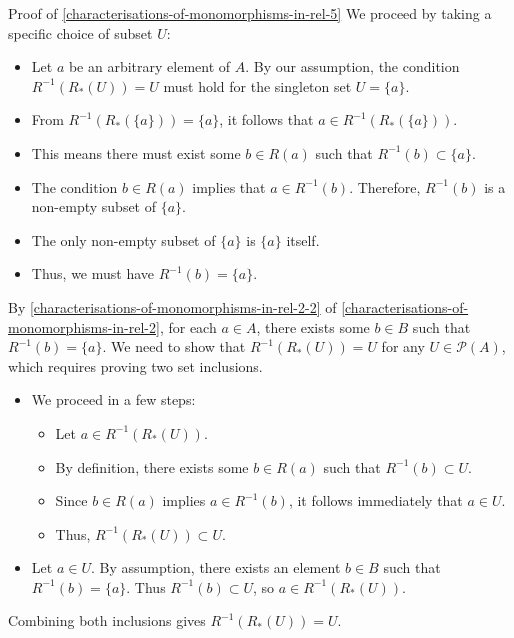 \begin{Proof}{Proof of \cref{characterisations-of-monomorphisms-in-rel-5}}
    We proceed by taking a specific choice of subset $U$:
    \begin{itemize}
        \item Let $a$ be an arbitrary element of $A$. By our assumption, the condition $R^{-1}(R_{*}(U))=U$ must hold for the singleton set $U=\{a\}$.
        \item From $R^{-1}(R_{*}(\{a\}))=\{a\}$, it follows that $a\in R^{-1}(R_{*}(\{a\}))$.
        \item This means there must exist some $b\in R(a)$ such that $R^{-1}(b)\subset\{a\}$.
        \item The condition $b\in R(a)$ implies that $a\in R^{-1}(b)$. Therefore, $R^{-1}(b)$ is a non-empty subset of $\{a\}$.
        \item The only non-empty subset of $\{a\}$ is $\{a\}$ itself.
        \item Thus, we must have $R^{-1}(b)=\{a\}$.
    \end{itemize}

    By \cref{characterisations-of-monomorphisms-in-rel-2-2} of \cref{characterisations-of-monomorphisms-in-rel-2}, for each $a\in A$, there exists some $b\in B$ such that $R^{-1}(b)=\{a\}$. We need to show that $R^{-1}(R_{*}(U))=U$ for any $U\in\mathcal{P}(A)$, which requires proving two set inclusions.
    \begin{itemize}
        \item{}We proceed in a few steps:
            \begin{itemize}
                \item Let $a\in R^{-1}(R_{*}(U))$.
                \item By definition, there exists some $b\in R(a)$ such that $R^{-1}(b)\subset U$.
                \item Since $b\in R(a)$ implies $a\in R^{-1}(b)$, it follows immediately that $a\in U$.
                \item Thus, $R^{-1}(R_{*}(U))\subset U$.
            \end{itemize}
        \item{}Let $a\in U$. By assumption, there exists an element $b\in B$ such that $R^{-1}(b)=\{a\}$. Thus $R^{-1}(b)\subset U$, so $a\in R^{-1}(R_{*}(U))$.
    \end{itemize}
    Combining both inclusions gives $R^{-1}(R_{*}(U))=U$.


\end{Proof}
